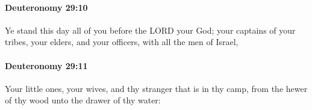		\paragraph{Deuteronomy 29:10} %
			\label{DEUTERONOMY-29-10}

			Ye stand this day all of you before the LORD your God; your captains of your tribes, your elders, and your officers, with all the men of Israel,


		\paragraph{Deuteronomy 29:11} %
			\label{DEUTERONOMY-29-11}

			Your little ones, your wives, and thy stranger that is in thy camp, from the hewer of thy wood unto the drawer of thy water:


